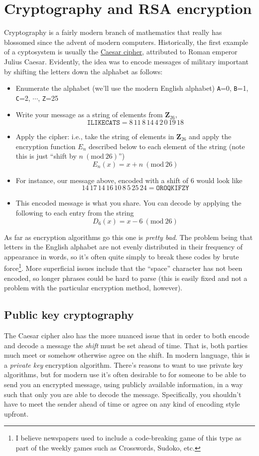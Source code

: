 \documentclass[12pt]{article}
\numberwithin{equation}{subsection}
\theoremstyle{note}
\newcommand{\Mod}[1]{\ (\mathrm{mod}\ #1)}
\begin{document}
\section{Cryptography and RSA encryption}
Cryptography is a fairly modern branch of mathematics that really has blossomed since the advent of modern computers. Historically, the first example of a cyptosystem is usually the \href{https://en.wikipedia.org/wiki/Caesar_cipher}{Caesar cipher}, attributed to Roman emperor Julius Caesar. Evidently, the idea was to encode messages of military important by shifting the letters down the alphabet as follows:
\begin{itemize}
	\item Enumerate the alphabet (we'll use the modern English alphabet) \texttt{A}=0, \texttt{B}=1, \texttt{C}=2, $\cdots$, \texttt{Z}=25
	\item Write your message as a string of elements from $\mathbf{Z}_{26}$, \[ \texttt{ILIKECATS}=8 \, 11\, 8 \,14\, 4\,2\, 0\, 19\, 18\]
	\item Apply the cipher: i.e., take the string of elements in $\mathbf{Z}_{26}$ and apply the encryption function $E_n$ described below to each element of the string (note this is just ``shift by $n\Mod{26}$'')\[E_n(x)=x+n\Mod{26}\]
	\item For instance, our message above, encoded with a shift of $6$ would look like \[ 14 \,17\, 14\, 16\, 10\, 8\, 5\, 25\, 24=\texttt{OROQKIFZY}\]
	\item This encoded message is what you share. You can decode by applying the following to each entry from the string \[ D_6(x)=x-6\Mod{26}\] 
	\end{itemize}
As far as encryption algorithms go this one is \textit{pretty bad}. The problem being that letters in the English alphabet are not evenly distributed in their frequency of appearance in words, so it's often quite simply to break these codes by brute force\footnote{I believe newspapers used to include a code-breaking game of this type as part of the weekly games such as Crosswords, Sudoko, etc.}. More superficial issues include that the ``space'' character has not been encoded, so longer phrases could be hard to parse (this is easily fixed and not a problem with the particular encryption method, however). 
	

	


\subsection{Public key cryptography}
The Caesar cipher also has the more nuanced issue that in order to both encode and decode a message the \textit{shift} must be set ahead of time. That is, both parties much meet or somehow otherwise agree on the shift. In modern language, this is a \textit{private key} encryption algorithm. There's reasons to want to use private key algorithms, but for modern use it's often desirable to for someone to be able to send you an encrypted message, using publicly available information, in a way such that only you are able to decode the message.  Specifically, you shouldn't have to meet the sender ahead of time or agree on any kind of encoding style upfront. 
\end{document}

